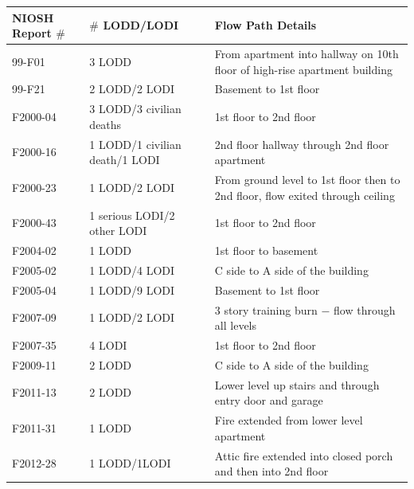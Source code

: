\documentclass[11pt,oneside]{book}
\begin{document}
\begin{table}
\centering
{}\label{tab:lodd}
\begin{tabular}{l l l}
\toprule[1.5pt]
NIOSH Report $\#$ & $\#$ LODD/LODI & Flow Path Details  \\
\midrule
\multirow{2}{*}{99-F01 \cite{NIOSH:Pettit} }    & \multirow{2}{*}{3 LODD}                                     & \multirow{2}{*}{\parbox{8cm} {From apartment into hallway on 10th floor of high-rise apartment building}} \\
                 &                                                    & \\
99-F21 \cite{NIOSH:Washenitz}         & 2 LODD/2 LODI                          & Basement to 1st floor \\
F2000-04 \cite{NIOSH:Mezzanotte}   & 3 LODD/3 civilian deaths            & 1st floor to 2nd floor \\
F2000-16 \cite{NIOSH:McFall} & 1 LODD/1 civilian death/1 LODI & 2nd floor hallway through 2nd floor apartment \\
\multirow{2}{*}{F2000-23 \cite{NIOSH:McFall2}} & \multirow{2}{*}{1 LODD/2 LODI       }                   & \multirow{2}{*}{\parbox{8cm} {From ground level to 1st floor then to 2nd floor, flow exited through ceiling}} \\
                 &                                                    & \\
F2000-43 \cite{NIOSH:McFall3}         & 1 serious LODI/2 other LODI      & 1st floor to 2nd floor \\
F2004-02  \cite{NIOSH:Berardinelli}  & 1 LODD                                       & 1st floor to basement \\
F2005-02 \cite{NIOSH:Koedam}        & 1 LODD/4 LODI                           & C side to A side of the building \\
F2005-04 \cite{NIOSH:McFall4}         & 1 LODD/9 LODI                           & Basement to 1st floor \\
F2007-09 \cite{NIOSH:Tarley}           & 1 LODD/2 LODI                           & 3 story training burn $-$ flow through all levels \\
F2007-35 \cite{NIOSH:Braddee}       & 4 LODI                                         & 1st floor to 2nd floor \\
F2009-11 \cite{NIOSH:Merinar}         & 2 LODD                                        & C side to A side of the building \\
F2011-13 \cite{NIOSH:Bowyer2}       & 2 LODD                                        & Lower level up stairs and through entry door and garage \\
F2011-31 \cite{NIOSH:Loflin}            & 1 LODD                                        & Fire extended from lower level apartment \\
F2012-28 \cite{NIOSH:Bowyer}        & 1 LODD/1LODI                            & Attic fire extended into closed porch and then into 2nd floor \\
\bottomrule[1.25pt]
\end{tabular}\par
\end{table}
\end{document}
